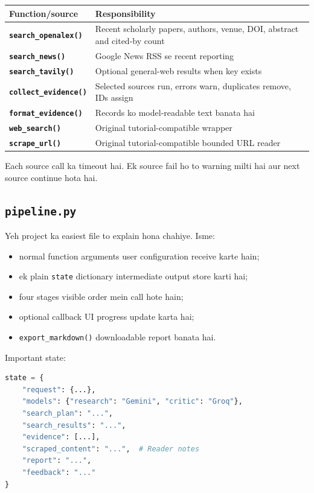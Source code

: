 \documentclass[11pt,a4paper]{article}
\newcommand{\code}[1]{\texttt{#1}}
\begin{document}
\begin{tabularx}{\textwidth}{>{\bfseries}p{} X}
\toprule
Function/source & Responsibility \\
\midrule
\code{search\_openalex()} & Recent scholarly papers, authors, venue, DOI, abstract and cited-by count \\
\code{search\_news()} & Google News RSS se recent reporting \\
\code{search\_tavily()} & Optional general-web results when key exists \\
\code{collect\_evidence()} & Selected sources run, errors warn, duplicates remove, IDs assign \\
\code{format\_evidence()} & Records ko model-readable text banata hai \\
\code{web\_search()} & Original tutorial-compatible wrapper \\
\code{scrape\_url()} & Original tutorial-compatible bounded URL reader \\
\bottomrule
\end{tabularx}

Each source call ka timeout hai. Ek source fail ho to warning milti hai aur next source continue hota hai.

\subsection{\texorpdfstring{\texttt{pipeline.py}}{pipeline.py}}

Yeh project ka easiest file to explain hona chahiye. Isme:

\begin{itemize}
  \item normal function arguments user configuration receive karte hain;
  \item ek plain \code{state} dictionary intermediate output store karti hai;
  \item four stages visible order mein call hote hain;
  \item optional callback UI progress update karta hai;
  \item \code{export\_markdown()} downloadable report banata hai.
\end{itemize}

Important state:

\begin{lstlisting}[language=Python]
state = {
    "request": {...},
    "models": {"research": "Gemini", "critic": "Groq"},
    "search_plan": "...",
    "search_results": "...",
    "evidence": [...],
    "scraped_content": "...",  # Reader notes
    "report": "...",
    "feedback": "..."
}
\end{lstlisting}
\end{document}
